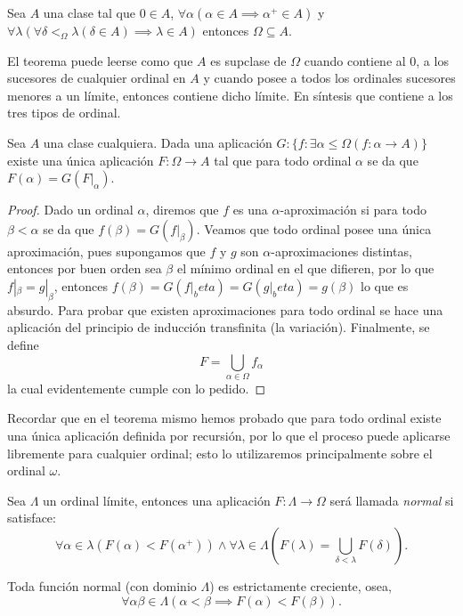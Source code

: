 \documentclass[11pt,a4paper]{book}
\begin{document}
\begin{thm}
	Sea $A$ una clase tal que $0\in A$, $\forall\alpha(\alpha\in A\implies\alpha^+\in A)$ y $\forall\lambda(\forall\delta\lt_\Omega\lambda(\delta\in A)\implies \lambda\in A)$ entonces $\Omega\subseteq A$.
\end{thm}
El teorema puede leerse como que $A$ es supclase de $\Omega$ cuando contiene al 0, a los sucesores de cualquier ordinal en $A$ y cuando posee a todos los ordinales sucesores menores a un límite, entonces contiene dicho límite. En síntesis que contiene a los tres tipos de ordinal.
\begin{thm}
	Sea $A$ una clase cualquiera. Dada una aplicación $G:\{f:\exists\alpha\leq\Omega(f:\alpha\rightarrow A)\}$ existe una única aplicación $F:\Omega\rightarrow A$ tal que para todo ordinal $\alpha$ se da que $F(\alpha)=G(F|_\alpha)$.
\end{thm}
\begin{proof}
	Dado un ordinal $\alpha$, diremos que $f$ es una $\alpha$-aproximación si para todo $\beta<\alpha$ se da que $f(\beta)=G(f|_\beta)$. Veamos que todo ordinal posee una única aproximación, pues supongamos que $f$ y $g$ son $\alpha$-aproximaciones distintas, entonces por buen orden sea $\beta$ el mínimo ordinal en el que difieren, por lo que $f|_\beta=g|_\beta$, entonces $f(\beta)=G(f|_beta)=G(g|_beta)=g(\beta)$ lo que es absurdo. Para probar que existen aproximaciones para todo ordinal se hace una aplicación del principio de inducción transfinita (la variación). Finalmente, se define
	$$F=\bigcup_{\alpha\in\Omega}f_\alpha$$
	la cual evidentemente cumple con lo pedido.
\end{proof}
Recordar que en el teorema mismo hemos probado que para todo ordinal existe una única aplicación definida por recursión, por lo que el proceso puede aplicarse libremente para cualquier ordinal; esto lo utilizaremos principalmente sobre el ordinal $\omega$.
\begin{mydef}
	Sea $\Lambda$ un ordinal límite, entonces una aplicación $F:\Lambda\rightarrow\Omega$ será llamada \textit{normal} si satisface:
	$$\forall\alpha\in\lambda(F(\alpha)<F(\alpha^+))\wedge\forall\lambda\in\Lambda(F(\lambda)=\bigcup_{\delta\lt\lambda}F(\delta)).$$
\end{mydef}
\begin{thm}\label{thm:normal-functions-crescent}
	Toda función normal (con dominio $\Lambda$) es estrictamente creciente, osea,
	$$\forall\alpha\beta\in\Lambda(\alpha<\beta\implies F(\alpha)<F(\beta)).$$
\end{thm}
\end{document}
